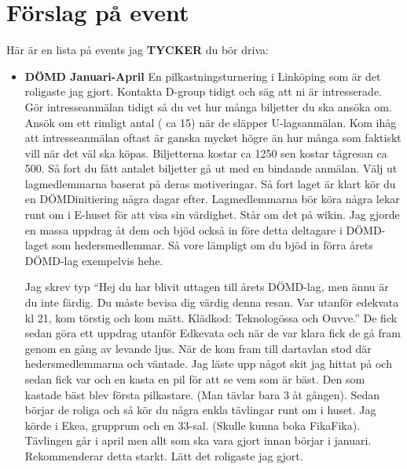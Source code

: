 \documentclass[10pt]{article}
\begin{document}
    \section{Förslag på event}
    Här är en lista på events jag \textbf{TYCKER} du bör driva:

    \begin{itemize}
        \item \textbf{DÖMD Januari-April} \newline
        En pilkastningsturnering i Linköping som är det roligaste jag gjort. Kontakta D-group tidigt och säg att ni är intresserade. Gör intresseanmälan tidigt så du vet hur många biljetter du ska ansöka om. Ansök om ett rimligt antal ( ca 15) när de släpper U-lagsanmälan. \newline
        Kom ihåg att intresseanmälan oftast är ganska mycket högre än hur många som faktiskt vill när det väl ska köpas. Biljetterna kostar ca 1250 sen kostar tågresan ca 500. \newline
        Så fort du fått antalet biljetter gå ut med en bindande anmälan. Välj ut lagmedlemmarna baserat på deras motiveringar. Så fort laget är klart kör du en DÖMDinitiering några dagar efter. Lagmedlemmarna bör köra några lekar runt om i E-huset för att visa sin värdighet. Står om det på wikin. \newline
        Jag gjorde en massa uppdrag åt dem och bjöd också in före detta deltagare i DÖMD-laget som hedersmedlemmar. Så vore lämpligt om du bjöd in förra årets DÖMD-lag exempelvis hehe. 

        Jag skrev typ ``Hej du har blivit uttagen till årets DÖMD-lag, men ännu är du inte färdig. Du måste bevisa dig värdig denna resan. Var utanför edekvata kl 21, kom törstig och kom mätt. Klädkod: Teknologössa och Ouvve.'' \newline
        De fick sedan göra ett uppdrag utanför Edkevata och när de var klara fick de gå fram genom en gång av levande ljus. När de kom fram till dartavlan stod där hedersmedlemmarna och väntade. Jag läste upp något skit jag hittat på och sedan fick var och en kasta en pil för att se vem som är bäst. Den som kastade bäst blev första pilkastare. (Man tävlar bara 3 åt gången). Sedan börjar de roliga och så kör du några enkla tävlingar runt om i huset. Jag körde i Ekea, grupprum och en 33-sal. (Skulle kunna boka FikaFika). \newline
        Tävlingen går i april men allt som ska vara gjort innan börjar i januari. \newline
        Rekommenderar detta starkt. Lätt det roligaste jag gjort.


\end{itemize}
\end{document}
